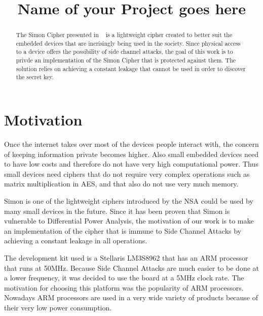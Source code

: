 \documentclass[conference]{IEEEtran}
\begin{document}
\title{Name of your Project goes here}


\author{
}
\maketitle

\begin{abstract}

  The Simon Cipher presented in ~\cite{Beaulieu_Simon} is a lightweight cipher created to better suit the embedded devices that are incrisingly being used in the society. Since physical access to a device offers the possibility of side channel attacks, the goal of this work is to privde an implementation of the Simon Cipher that is protected against them. The solution relies on achieving a constant leakage that cannot be used in order to discover the secret key.

\end{abstract}

\section{Motivation}

Once the internet takes over most of the devices people interact with, the concern of keeping information private becomes higher. Also small embedded devices need to have low costs and therefore do not have very high computational power. Thus small devices need ciphers that do not require very complex operations such as matrix multiplication in AES, and that also do not use very much memory.

Simon is one of the lightweight ciphers introduced by the NSA could be used by many small devices in the future. Since it has been proven that Simon is vulnerable to Differential Power Analysis, the motivation of our work is to make an implementation of the cipher that is immune to Side Channel Attacks by achieving a constant leakage in all operations.

The development kit used is a Stellaris LM3S8962 that has an ARM processor that runs at 50MHz. Because Side Channel Attacks are much easier to be done at a lower frequency, it was decided to use the board at a 5MHz clock rate. The motivation for choosing this platform was the popularity of ARM processors. Nowadays ARM processors are used in a very wide variety of products because of their very low power consumption.
\end{document}
